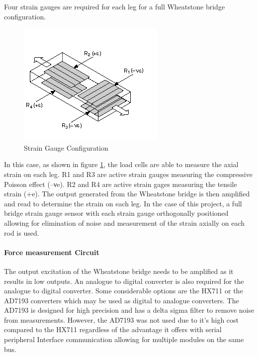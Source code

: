 Four strain gauges are required for each leg for a full Wheatstone bridge configuration. 
\begin{center}
	\begin{figure}[H]
		\centering
		\includegraphics{Figures/loadConf}
		\caption[Strain Gauge Configuration]{Strain Gauge Configuration \cite{noauthor_measuring_nodate}}
		\label{strain}
	\end{figure}
\end{center}
In this case, as shown in figure \ref{strain}, the load cells are able to measure the axial strain on each leg. R1 and R3 are active strain gauges measuring the compressive Poisson effect (–νe). R2 and R4 are active strain gages measuring the tensile strain (+e). The output generated from the Wheatstone bridge is then amplified and read to determine the strain on each leg.
In the case of this project, a full bridge strain gauge sensor with each strain gauge orthogonally positioned allowing for elimination of noise and measurement of the strain axially on each rod is used.

\paragraph{Force measurement Circuit}

The output excitation of the Wheatstone bridge needs to be amplified as it results in low outputs. An analogue to digital converter is also required for the analogue to digital converter. Some considerable options are the HX711 or the AD7193 converters which may be used as digital to analogue converters. The AD7193 is designed for high precision and has a delta sigma filter to remove noise from measurements.  However, the AD7193 was not used due to it's high cost compared to the HX711 regardless of the advantage it offers with serial peripheral Interface communication allowing for multiple modules on the same bus.

